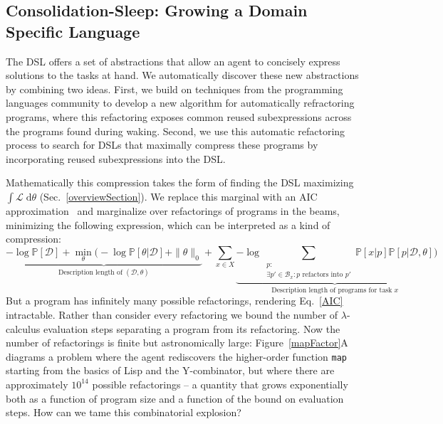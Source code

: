 \documentclass{article}
\newcommand{\lowerBound}{\mathscr{L}}
\newcommand{\code}[1]{{\footnotesize\texttt{#1}}}
\newcommand{\probability}{\mathds{P}} %
\begin{document}
\subsection{Consolidation-Sleep: Growing a Domain Specific Language}\label{consolidationSection}

The DSL offers a set of abstractions that allow an agent to concisely
express solutions to the tasks at hand. We automatically discover
these new abstractions by combining two ideas. First, we build on
techniques from the programming languages community to develop a new
algorithm for automatically refractoring programs, where this
refactoring exposes common reused subexpressions across the
programs found during waking.  Second, we use this automatic refactoring
process to search for DSLs that maximally compress these programs by
incorporating reused subexpressions into the DSL.

Mathematically this compression takes the form of
finding the DSL maximizing $\int \lowerBound\;\mathrm{d}\theta$ (Sec.~\ref{overviewSection}).
We replace this marginal with an AIC approximation~\cite{akaike1998information}
and marginalize over refactorings of programs in the beams, minimizing the following expression,
which can be interpreted as a kind of compression:
\begin{equation}
\underbrace{-\log \probability[\mathcal{D}] + \min_{\theta}\Bigg(-\log
\probability[\theta|\mathcal{D}] + \|\theta\|_0}_{\text{Description length of }(\mathcal{D},\theta)} +\sum_{x\in
  X}\underbrace{-\log \sum_{\substack{p:\\
      \exists p'\in
  \mathcal{B}_x: p\text{ refactors into }p'}}\probability[x|p]\probability[p|\mathcal{D},\theta]}_{\text{Description length of programs for task }x}\Bigg)
\label{AIC}
\end{equation}
But a program has infinitely many possible refactorings, rendering
Eq.~\ref{AIC} intractable.  Rather than consider every refactoring we
bound the number of $\lambda$-calculus evaluation steps separating a
program from its refactoring.  Now the number of refactorings is
finite but astronomically large: Figure~\ref{mapFactor}A diagrams a
problem where the agent rediscovers the higher-order function
\code{map} starting from the basics of Lisp and the Y-combinator, but
where there are approximately $10^{14}$ possible refactorings -- a quantity
that grows exponentially both as a function of program size and a
function of the bound on evaluation steps. How can we tame this
combinatorial explosion?
\end{document}
